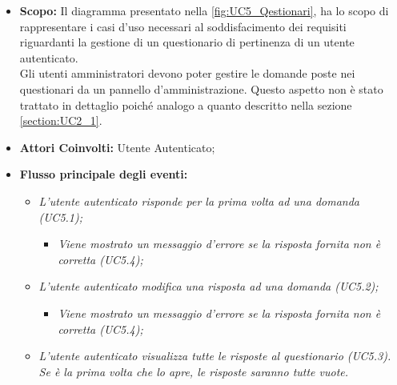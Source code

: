			\begin{itemize}
				\item \textbf{Scopo:} Il diagramma presentato nella \autoref{fig:UC5_Qestionari}, ha lo scopo di rappresentare i casi d'uso necessari al soddisfacimento dei requisiti riguardanti la gestione di un questionario di pertinenza di un utente autenticato. \\ 
				Gli utenti amministratori devono poter gestire le domande poste nei questionari da un pannello d'amministrazione. Questo aspetto non è stato trattato in dettaglio poiché analogo a quanto descritto nella sezione \ref{section:UC2_1}.
				\item \textbf{Attori Coinvolti:} Utente Autenticato;
				\item \textbf{Flusso principale degli eventi:} 
				\begin{itemize}
					\item \textit{L'utente autenticato risponde per la prima volta ad una domanda (UC5.1);}
					\begin{itemize}
						\item \textit{Viene mostrato un messaggio d'errore se la risposta fornita non è corretta (UC5.4);}
					\end{itemize}
					\item \textit{L'utente autenticato modifica una risposta ad una domanda (UC5.2);}
					\begin{itemize}
						\item \textit{Viene mostrato un messaggio d'errore se la risposta fornita non è corretta (UC5.4);}
					\end{itemize}
					\item \textit{L'utente autenticato visualizza tutte le risposte al questionario (UC5.3). Se è la prima volta che lo apre, le risposte saranno tutte vuote.}
				\end{itemize}
			\end{itemize}



	\newpage		
